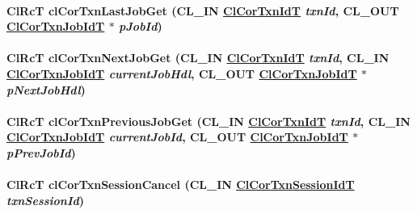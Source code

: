\hypertarget{group__group13_ga79}{
\paragraph[clCorTxnLastJobGet]{\setlength{\rightskip}{0pt plus 5cm}Cl\-Rc\-T cl\-Cor\-Txn\-Last\-Job\-Get (CL\_\-IN \hyperlink{group__group13_ga17}{Cl\-Cor\-Txn\-Id\-T} {\em txn\-Id}, CL\_\-OUT \hyperlink{group__group13_ga18}{Cl\-Cor\-Txn\-Job\-Id\-T} $\ast$ {\em p\-Job\-Id})}\hfill}
\label{group__group13_ga79}


\hypertarget{group__group13_ga80}{
\paragraph[clCorTxnNextJobGet]{\setlength{\rightskip}{0pt plus 5cm}Cl\-Rc\-T cl\-Cor\-Txn\-Next\-Job\-Get (CL\_\-IN \hyperlink{group__group13_ga17}{Cl\-Cor\-Txn\-Id\-T} {\em txn\-Id}, CL\_\-IN \hyperlink{group__group13_ga18}{Cl\-Cor\-Txn\-Job\-Id\-T} {\em current\-Job\-Hdl}, CL\_\-OUT \hyperlink{group__group13_ga18}{Cl\-Cor\-Txn\-Job\-Id\-T} $\ast$ {\em p\-Next\-Job\-Hdl})}\hfill}
\label{group__group13_ga80}


\hypertarget{group__group13_ga81}{
\paragraph[clCorTxnPreviousJobGet]{\setlength{\rightskip}{0pt plus 5cm}Cl\-Rc\-T cl\-Cor\-Txn\-Previous\-Job\-Get (CL\_\-IN \hyperlink{group__group13_ga17}{Cl\-Cor\-Txn\-Id\-T} {\em txn\-Id}, CL\_\-IN \hyperlink{group__group13_ga18}{Cl\-Cor\-Txn\-Job\-Id\-T} {\em current\-Job\-Id}, CL\_\-OUT \hyperlink{group__group13_ga18}{Cl\-Cor\-Txn\-Job\-Id\-T} $\ast$ {\em p\-Prev\-Job\-Id})}\hfill}
\label{group__group13_ga81}


\hypertarget{group__group13_ga68}{
\paragraph[clCorTxnSessionCancel]{\setlength{\rightskip}{0pt plus 5cm}Cl\-Rc\-T cl\-Cor\-Txn\-Session\-Cancel (CL\_\-IN \hyperlink{group__group13_ga16}{Cl\-Cor\-Txn\-Session\-Id\-T} {\em txn\-Session\-Id})}\hfill}
\label{group__group13_ga68}


